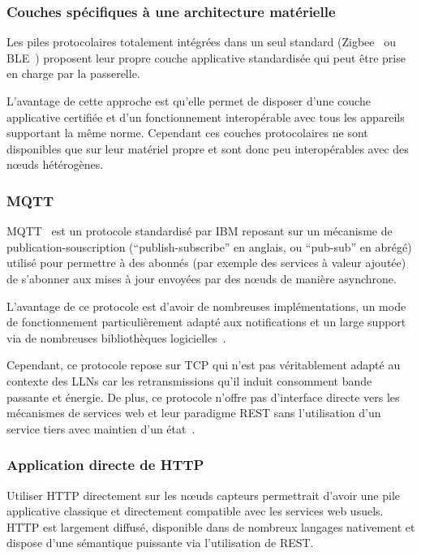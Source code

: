 \subsubsection{Couches spécifiques à une architecture matérielle}

Les piles protocolaires totalement intégrées dans un seul standard (Zigbee~\cite{zigbeeCritic} ou \ac{BLE}~\cite{bleCritic}) proposent leur propre couche applicative standardisée qui peut être prise en charge par la passerelle.

L'avantage de cette approche est qu'elle permet de disposer d'une couche applicative certifiée et d'un fonctionnement interopérable avec tous les appareils supportant la même norme.
Cependant ces couches protocolaires ne sont disponibles que sur leur matériel propre et sont donc peu interopérables avec des nœuds hétérogènes.

\subsubsection{\ac{MQTT}}

\ac{MQTT}~\cite{hunkeler2008mqtt} est un protocole standardisé par IBM reposant sur un mécanisme de publication-souscription (``publish-subscribe'' en anglais, ou ``pub-sub'' en abrégé) utilisé pour permettre à des abonnés (par exemple des services à valeur ajoutée) de s'abonner aux mises à jour envoyées par des nœuds de manière asynchrone.

L'avantage de ce protocole est d'avoir de nombreuses implémentations, un mode de fonctionnement particulièrement adapté aux notifications et un large support via de nombreuses bibliothèques logicielles~\cite{stanford2008mqtt}.

Cependant, ce protocole repose sur \ac{TCP} qui n'est pas véritablement adapté au contexte des \ac{LLN}s car les retransmissions qu'il induit consomment bande passante et énergie.
De plus, ce protocole n'offre pas d'interface directe vers les mécanismes de services web et leur paradigme \ac{REST} sans l'utilisation d'un service tiers avec maintien d'un état~\cite{collina2012introducing}.

\subsubsection{Application directe de \ac{HTTP}}

Utiliser \ac{HTTP} directement sur les nœuds capteurs permettrait d'avoir une pile applicative classique et directement compatible avec les services web usuels.
\ac{HTTP} est largement diffusé, disponible dans de nombreux langages nativement et dispose d'une sémantique puissante via l'utilisation de \ac{REST}.

